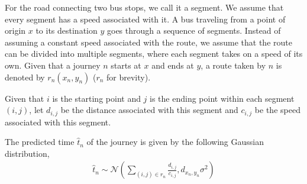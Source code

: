 \documentclass{sig-alternate}
\begin{document}
For the road connecting two bus stops, we call it a segment. We assume that every segment has a speed associated with it. A bus traveling from a point of origin $x$ to its destination $y$ goes through a sequence of segments. Instead of assuming a constant speed associated with the route, we assume that the route can be divided into multiple segments, where each segment takes on a speed of its own. Given that a journey $n$ starts at $x$ and ends at $y$, a route taken by $n$ is denoted by $r_n(x_n, y_n)$ ($r_n$ for brevity).

Given that $i$ is the starting point and $j$ is the ending point within each segment $(i, j)$, let $d_{i,j}$ be the distance associated with this segment and $c_{i,j}$ be the speed associated with this segment.

The predicted time $\hat{t}_n$ of the journey is given by the following Gaussian distribution,
\begin{gather}
\hat{t}_n \sim \mathcal{N} \left( \sum_{ (i,j) \in r_n } \frac{ d_{i,j} }{ c_{i,j} }, d_{x_n, y_n} \sigma^2 \right)
\end{gather}

\end{document}
